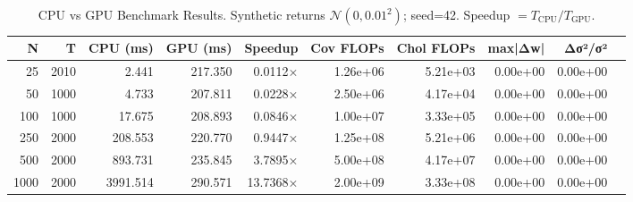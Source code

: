 \begin{table}[ht]
\centering
\caption{CPU vs GPU Benchmark Results. Synthetic returns $\mathcal{N}(0,0.01^2)$; seed=42. Speedup $= T_{\text{CPU}}/T_{\text{GPU}}$.}
\label{tab:benchmark}
\begin{tabular}{rrrrrrrrrr}
\toprule
N & T & CPU (ms) & GPU (ms) & Speedup & Cov FLOPs & Chol FLOPs & max|Δw| & Δσ²/σ² \\
\midrule
25 & 2010 & 2.441 & 217.350 & 0.0112× & 1.26e+06 & 5.21e+03 & 0.00e+00 & 0.00e+00 \\
50 & 1000 & 4.733 & 207.811 & 0.0228× & 2.50e+06 & 4.17e+04 & 0.00e+00 & 0.00e+00 \\
100 & 1000 & 17.675 & 208.893 & 0.0846× & 1.00e+07 & 3.33e+05 & 0.00e+00 & 0.00e+00 \\
250 & 2000 & 208.553 & 220.770 & 0.9447× & 1.25e+08 & 5.21e+06 & 0.00e+00 & 0.00e+00 \\
500 & 2000 & 893.731 & 235.845 & 3.7895× & 5.00e+08 & 4.17e+07 & 0.00e+00 & 0.00e+00 \\
1000 & 2000 & 3991.514 & 290.571 & 13.7368× & 2.00e+09 & 3.33e+08 & 0.00e+00 & 0.00e+00 \\
\bottomrule
\end{tabular}
\end{table}
